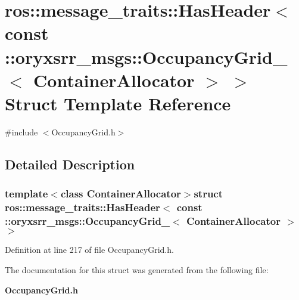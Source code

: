 \section{ros\-:\-:message\-\_\-traits\-:\-:\-Has\-Header$<$ const \-:\-:oryxsrr\-\_\-msgs\-:\-:\-Occupancy\-Grid\-\_\-$<$ \-Container\-Allocator $>$ $>$ \-Struct \-Template \-Reference}
\label{structros_1_1message__traits_1_1HasHeader_3_01const_01_1_1oryxsrr__msgs_1_1OccupancyGrid___3_01ContainerAllocator_01_4_01_4}


{\ttfamily \#include $<$\-Occupancy\-Grid.\-h$>$}



\subsection{\-Detailed \-Description}
\subsubsection*{template$<$class Container\-Allocator$>$struct ros\-::message\-\_\-traits\-::\-Has\-Header$<$ const \-::oryxsrr\-\_\-msgs\-::\-Occupancy\-Grid\-\_\-$<$ Container\-Allocator $>$ $>$}



\-Definition at line 217 of file \-Occupancy\-Grid.\-h.



\-The documentation for this struct was generated from the following file\-:\begin{DoxyCompactItemize}
\item 
{\bf \-Occupancy\-Grid.\-h}\end{DoxyCompactItemize}
